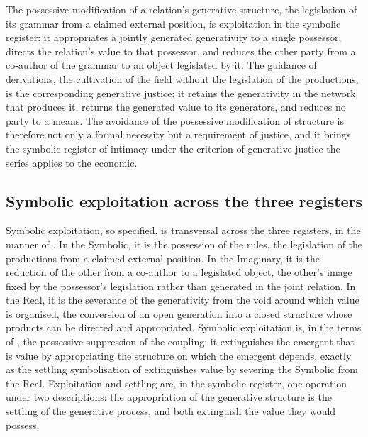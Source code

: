 \begin{claim}
The possessive modification of a relation's generative structure, the legislation of its grammar from a claimed external position, is exploitation in the symbolic register: it appropriates a jointly generated generativity to a single possessor, directs the relation's value to that possessor, and reduces the other party from a co-author of the grammar to an object legislated by it. The guidance of derivations, the cultivation of the field without the legislation of the productions, is the corresponding generative justice: it retains the generativity in the network that produces it, returns the generated value to its generators, and reduces no party to a means. The avoidance of the possessive modification of structure is therefore not only a formal necessity but a requirement of justice, and it brings the symbolic register of intimacy under the criterion of generative justice the series applies to the economic.
\end{claim}

\subsection{Symbolic exploitation across the three registers}
\label{p10:sec:exp-registers}

Symbolic exploitation, so specified, is transversal across the three registers, in the manner of . In the Symbolic, it is the possession of the rules, the legislation of the productions from a claimed external position. In the Imaginary, it is the reduction of the other from a co-author to a legislated object, the other's image fixed by the possessor's legislation rather than generated in the joint relation. In the Real, it is the severance of the generativity from the void around which value is organised, the conversion of an open generation into a closed structure whose products can be directed and appropriated. Symbolic exploitation is, in the terms of , the possessive suppression of the coupling: it extinguishes the emergent that is value by appropriating the structure on which the emergent depends, exactly as the settling symbolisation of  extinguishes value by severing the Symbolic from the Real. Exploitation and settling are, in the symbolic register, one operation under two descriptions: the appropriation of the generative structure is the settling of the generative process, and both extinguish the value they would possess.

